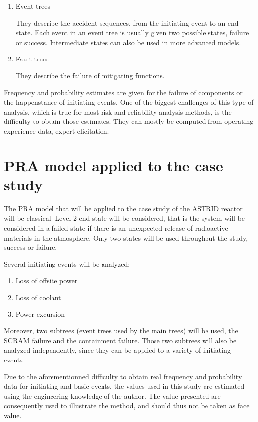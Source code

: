 \begin{enumerate}
\item Event trees

They describe the accident sequences, from the initiating event to an end state. Each event in an event tree is usually given two possible states, failure or success. Intermediate states can also be used in more advanced models.

\item Fault trees

They describe the failure of mitigating functions.
\end{enumerate}

Frequency and probability estimates are given for the failure of components or the happenstance of initiating events. One of the biggest challenges of this type of analysis, which is true for most risk and reliability analysis methods, is the difficulty to obtain those estimates. They can mostly be computed from operating experience data, expert elicitation.

\section{PRA model applied to the case study}

The PRA model that will be applied to the case study of the ASTRID reactor will be classical. Level-2 end-state will be considered, that is the system will be considered in a failed state if there is an unexpected release of radioactive materials in the atmosphere. Only two states will be used throughout the study, success or failure.

Several initiating events will be analyzed:

\begin{enumerate}
\item Loss of offsite power
\item Loss of coolant
\item Power excursion
\end{enumerate}

Moreover, two subtrees (event trees used by the main trees) will be used, the SCRAM failure and the containment failure. Those two subtrees will also be analyzed independently, since they can be applied to a variety of initiating events.

Due to the aforementionned difficulty to obtain real frequency and probability data for initiating and basic events, the values used in this study are estimated using the engineering knowledge of the author. The value presented are consequently used to illustrate the method, and should thus not be taken as face value.

